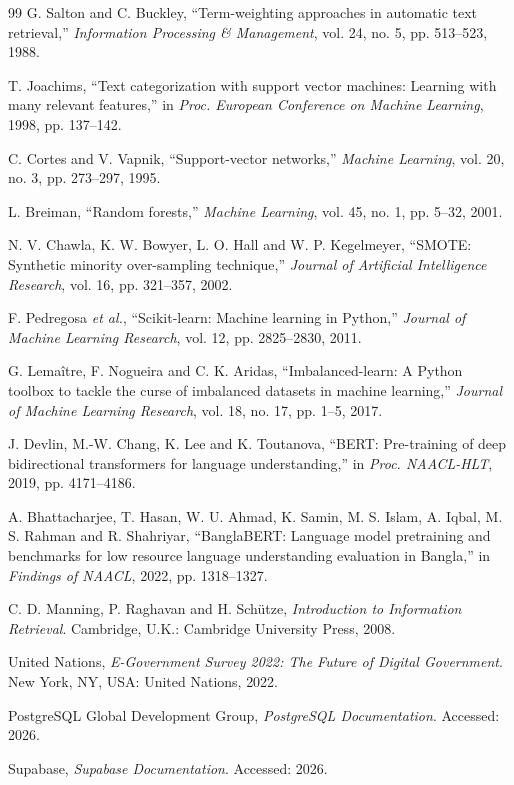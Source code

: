 \documentclass[12pt,a4paper,openany]{book}
\begin{document}
\begin{thebibliography}{99}
G. Salton and C. Buckley, ``Term-weighting approaches in automatic text retrieval,'' \textit{Information Processing \& Management}, vol. 24, no. 5, pp. 513--523, 1988.

T. Joachims, ``Text categorization with support vector machines: Learning with many relevant features,'' in \textit{Proc. European Conference on Machine Learning}, 1998, pp. 137--142.

C. Cortes and V. Vapnik, ``Support-vector networks,'' \textit{Machine Learning}, vol. 20, no. 3, pp. 273--297, 1995.

L. Breiman, ``Random forests,'' \textit{Machine Learning}, vol. 45, no. 1, pp. 5--32, 2001.

N. V. Chawla, K. W. Bowyer, L. O. Hall and W. P. Kegelmeyer, ``SMOTE: Synthetic minority over-sampling technique,'' \textit{Journal of Artificial Intelligence Research}, vol. 16, pp. 321--357, 2002.

F. Pedregosa \textit{et al.}, ``Scikit-learn: Machine learning in Python,'' \textit{Journal of Machine Learning Research}, vol. 12, pp. 2825--2830, 2011.

G. Lema{\^i}tre, F. Nogueira and C. K. Aridas, ``Imbalanced-learn: A Python toolbox to tackle the curse of imbalanced datasets in machine learning,'' \textit{Journal of Machine Learning Research}, vol. 18, no. 17, pp. 1--5, 2017.

J. Devlin, M.-W. Chang, K. Lee and K. Toutanova, ``BERT: Pre-training of deep bidirectional transformers for language understanding,'' in \textit{Proc. NAACL-HLT}, 2019, pp. 4171--4186.

A. Bhattacharjee, T. Hasan, W. U. Ahmad, K. Samin, M. S. Islam, A. Iqbal, M. S. Rahman and R. Shahriyar, ``BanglaBERT: Language model pretraining and benchmarks for low resource language understanding evaluation in Bangla,'' in \textit{Findings of NAACL}, 2022, pp. 1318--1327.

C. D. Manning, P. Raghavan and H. Sch{\"u}tze, \textit{Introduction to Information Retrieval}. Cambridge, U.K.: Cambridge University Press, 2008.

United Nations, \textit{E-Government Survey 2022: The Future of Digital Government}. New York, NY, USA: United Nations, 2022.

PostgreSQL Global Development Group, \textit{PostgreSQL Documentation}. Accessed: 2026.

Supabase, \textit{Supabase Documentation}. Accessed: 2026.
\end{thebibliography}
\end{document}
